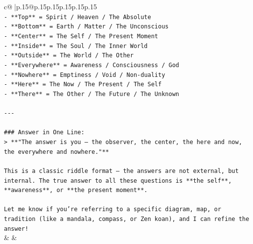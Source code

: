 \documentclass{article}
\begin{document}
{\begin{supertabular}{c@{$\;$}|p{.15\linewidth}@{}p{.15\linewidth}p{.15\linewidth}p{.15\linewidth}p{.15\linewidth}p{.15\linewidth}}
{{{\\ 
\texttt{{-} **Top** = Spirit / Heaven / The Absolute  } \\
\texttt{{-} **Bottom** = Earth / Matter / The Unconscious  } \\
\texttt{{-} **Center** = The Self / The Present Moment  } \\
\texttt{{-} **Inside** = The Soul / The Inner World  } \\
\texttt{{-} **Outside** = The World / The Other  } \\
\texttt{{-} **Everywhere** = Awareness / Consciousness / God  } \\
\texttt{{-} **Nowhere** = Emptiness / Void / Non{-}duality  } \\
\texttt{{-} **Here** = The Now / The Present / The Self  } \\
\texttt{{-} **There** = The Other / The Future / The Unknown  } \\
\\ 
\texttt{{-}{-}{-}} \\
\\ 
\texttt{\#\#\# Answer in One Line:} \\
\texttt{> **"The answer is you — the observer, the center, the here and now, the everywhere and nowhere."**} \\
\\ 
\texttt{This is a classic riddle format — the answers are not external, but internal. The true answer to all these questions is **the self**, **awareness**, or **the present moment**.} \\
\\ 
\texttt{Let me know if you're referring to a specific diagram, map, or tradition (like a mandala, compass, or Zen koan), and I can refine the answer!} \\
            }
        }
    }
    & & \\ \\


\end{supertabular}}
\end{document}
